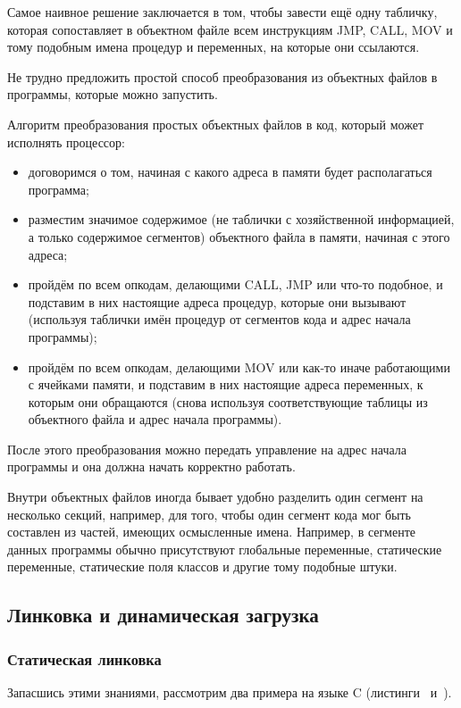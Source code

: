 Самое наивное решение заключается в том, чтобы завести ещё одну табличку, которая сопоставляет в объектном файле всем инструкциям JMP, CALL, MOV и тому подобным имена процедур и переменных, на которые они ссылаются.

Не трудно предложить простой способ преобразования из объектных файлов в программы, которые можно запустить.
\begin{algorithm}\label{alg:link-simple}
    Алгоритм преобразования простых объектных файлов в код, который может исполнять процессор:
    \begin{itemize}
        \item договоримся о том, начиная с какого адреса в памяти будет располагаться программа;
        \item разместим значимое содержимое (не таблички с хозяйственной информацией, а только содержимое сегментов) объектного файла в памяти, начиная с этого адреса;
        \item пройдём по всем опкодам, делающими CALL, JMP или что-то подобное, и подставим в них настоящие адреса процедур, которые они вызывают (используя таблички имён процедур от сегментов кода и адрес начала программы);
        \item пройдём по всем опкодам, делающими MOV или как-то иначе работающими с ячейками памяти, и подставим в них настоящие адреса переменных, к которым они обращаются (снова используя соответствующие таблицы из объектного файла и адрес начала программы).
    \end{itemize}
\end{algorithm}

После этого преобразования можно передать управление на адрес начала программы и она должна начать корректно работать.

Внутри объектных файлов иногда бывает удобно разделить один сегмент на несколько секций, например, для того, чтобы один сегмент кода мог быть составлен из частей, имеющих осмысленные имена.
Например, в сегменте данных программы обычно присутствуют глобальные переменные, статические переменные, статические поля классов и другие тому подобные штуки.

\subsection{Линковка и динамическая загрузка}
\subsubsection{Статическая линковка}
Запасшись этими знаниями, рассмотрим два примера на языке C (листинги~ и~).

